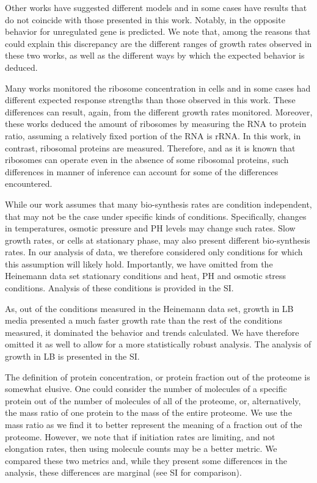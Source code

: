 \documentclass[notitlepage]{article}
\begin{document}
Other works have suggested different models and in some cases have results that do not coincide with those presented in this work.
Notably, in \parencite{Klumpp2009a} the opposite behavior for unregulated gene is predicted.
We note that, among the reasons that could explain this discrepancy are the different ranges of growth rates observed in these two works, as well as the different ways by which the expected behavior is deduced.

Many works monitored the ribosome concentration in cells \parencite{Scott2010, Bremer1987, Schaechter1958, 1974, eco-sal} and in some cases had different expected response strengths than those observed in this work.
These differences can result, again, from the different growth rates monitored.
Moreover, these works deduced the amount of ribosomes by measuring the RNA to protein ratio, assuming a relatively fixed portion of the RNA is rRNA.
In this work, in contrast, ribosomal proteins are measured.
Therefore, and as it is known that ribosomes can operate even in the absence of some ribosomal proteins, such differences in manner of inference can account for some of the differences encountered.

While our work assumes that many bio-synthesis rates are condition independent, that may not be the case under specific kinds of conditions.
Specifically, changes in temperatures, osmotic pressure and PH levels may change such rates.
Slow growth rates, or cells at stationary phase, may also present different bio-synthesis rates.
In our analysis of data, we therefore considered only conditions for which this assumption will likely hold.
Importantly, we have omitted from the Heinemann data set stationary conditions and heat, PH and osmotic stress conditions.
Analysis of these conditions is provided in the SI.

As, out of the conditions measured in the Heinemann data set, growth in LB media presented a much faster growth rate than the rest of the conditions measured, it dominated the behavior and trends calculated.
We have therefore omitted it as well to allow for a more statistically robust analysis.
The analysis of growth in LB is presented in the SI.

The definition of protein concentration, or protein fraction out of the proteome is somewhat elusive.
One could consider the number of molecules of a specific protein out of the number of molecules of all of the proteome, or, alternatively, the mass ratio of one protein to the mass of the entire proteome.
We use the mass ratio as we find it to better represent the meaning of a fraction out of the proteome.
However, we note that if initiation rates are limiting, and not elongation rates, then using molecule counts may be a better metric.
We compared these two metrics and, while they present some differences in the analysis, these differences are marginal (see SI for comparison).
\end{document}
